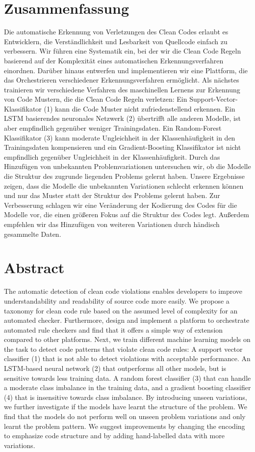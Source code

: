 \section*{Zusammenfassung}

Die automatische Erkennung von Verletzungen des Clean Codes erlaubt es Entwicklern, die Verständlichkeit und Lesbarkeit von Quellcode einfach zu verbessern. Wir führen eine Systematik ein, bei der wir die Clean Code Regeln basierend auf der Komplexität eines automatischen Erkennungsverfahren einordnen. Darüber hinaus entwerfen und implementieren wir eine Plattform, die das Orchestrieren verschiedener Erkennungsverfahren ermöglicht. Als nächstes trainieren wir verschiedene Verfahren des maschinellen Lernens zur Erkennung von Code Mustern, die die Clean Code Regeln verletzen: Ein Support-Vector-Klassifikator (1) kann die Code Muster nicht zufriedenstellend erkennen. Ein LSTM basierendes neuronales Netzwerk (2) übertrifft alle anderen Modelle, ist aber empfindlich gegenüber weniger Trainingsdaten. Ein Random-Forest Klassifikator (3) kann moderate Ungleichheit in der Klassenhäufigkeit in den Trainingsdaten kompensieren und ein Gradient-Boosting Klassifikator ist nicht empfindlich gegenüber Ungleichheit in der Klassenhäufigkeit. Durch das Hinzufügen von unbekannten Problemvariationen untersuchen wir, ob die Modelle die Struktur des zugrunde liegenden Problems gelernt haben. Unsere Ergebnisse zeigen, dass die Modelle die unbekannten Variationen schlecht erkennen können und nur das Muster statt der Struktur des Problems gelernt haben. Zur Verbesserung schlagen wir eine Veränderung der Kodierung des Codes für die Modelle vor, die einen größeren Fokus auf die Struktur des Codes legt. Außerdem empfehlen wir das Hinzufügen von weiteren Variationen durch händisch gesammelte Daten.
 
\newpage
\section*{Abstract}    
The automatic detection of clean code violations enables developers to improve understandability and readability of source code more easily. We propose a taxonomy for clean code rule based on the assumed level of complexity for an automated checker. Furthermore, design and implement a platform to orchestrate automated rule checkers and find that it offers a simple way of extension compared to other platforms. Next, we train different machine learning models on the task to detect code patterns that violate clean code rules: A support vector classifier (1) that is not able to detect violations with acceptable performance. An LSTM-based neural network (2) that outperforms all other models, but is sensitive towards less training data. A random forest classifier (3) that can handle a moderate class imbalance in the training data, and a gradient boosting classifier (4) that is insensitive towards class imbalance. By introducing unseen variations, we further investigate if the models have learnt the structure of the problem. We find that the models do not perform well on unseen problem variations and only learnt the problem pattern. We suggest improvements by changing the encoding to emphasize code structure and by adding hand-labelled data with more variations.